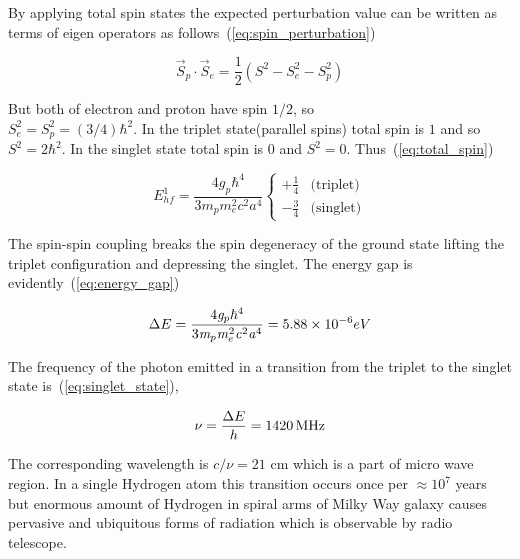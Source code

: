 \documentclass[conference]{IEEEtran}
\begin{document}
By applying total spin states the expected perturbation value can be written as terms of eigen operators as follows~(\ref{eq:spin_perturbation})

\begin{equation}
  \vec{S}_{p}\cdot\vec{S}_{e}=\frac{1}{2}(\mathit{S}^{2}-\mathit{S}_{e}^{2}-\mathit{S}_{p}^{2})
  \label{eq:spin_perturbation}
 \end{equation}
 
But both of electron and proton have spin $1/2$, so\\ $\mathit{S}_{e}^{2}=\mathit{S}_{p}^{2}=(3/4)\mathit{\hbar}^{2}$. In the triplet state(parallel spins) total spin is $1$ and so $\mathit{S}^{2}=2\mathit{\hbar}^{2}$. In the singlet state total spin is $0$ and $\mathit{S}^{2}=0$. Thus~(\ref{eq:total_spin})

\begin{equation}
\label{eq:total_spin}
 \mathit{E}_{hf}^{1}=\frac{4\mathit{g}_{p}\mathit{\hbar}^{4}}{3\mathit{m}_{p}\mathit{m}_{e}^{2}\mathit{c}^{2}\mathit{a}^{4}}\begin{cases}
 +\frac{1}{4}& \text{(triplet)}\\
 -\frac{3}{4}& \text{(singlet)}
\end{cases} 
\end{equation}

The spin-spin coupling breaks the spin degeneracy of the ground state lifting the triplet configuration and depressing the singlet. The energy gap is evidently~(\ref{eq:energy_gap})

\begin{equation}
 \Delta\-E=\frac{4\mathit{g}_{p}\mathit{\hbar}^{4}}{3\mathit{m}_{p}\mathit{m}_{e}^{2}\mathit{c}^{2}\mathit{a}^{4}}=5.88\times10^{-6} eV
 \label{eq:energy_gap}
\end{equation}


The frequency of the photon emitted in a transition from the triplet to the singlet state is~(\ref{eq:singlet_state}),

\begin{equation}
 \mathit{\nu}=\frac{\Delta\-E}{h}=\SI{1420}{MHz}
 \label{eq:singlet_state}
\end{equation}

The corresponding wavelength is $c/\nu=21$ cm which is a part of micro wave region\cite{griffiths2016introduction,santo2013mapping}. In a single Hydrogen atom this transition occurs once per $\approx10^{7}$ years but enormous amount of Hydrogen in spiral arms of Milky Way galaxy causes pervasive and ubiquitous forms of radiation which is observable by radio telescope\cite{santo2013mapping}.
\end{document}
